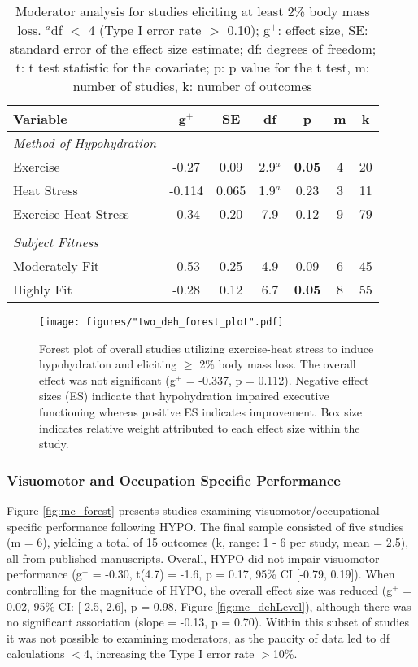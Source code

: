\begin{table}
	\caption{Moderator analysis for studies eliciting at least 2\% body mass loss. ${^a}$df ${<}$ 4 (Type I error rate ${>}$ 0.10); g${^+}$: effect size, SE: standard error of the effect size estimate; df: degrees of freedom; t: t test statistic for the covariate; p: p value for the t test, m: number of studies, k: number of outcomes}
	\centering
	\begin{tabular}{lcccccc} 
		\hline
		\textbf{Variable} & \textbf{g${^+}$} & \textbf{SE} & \textbf{df} & \textbf{p} & \textbf{m} & 
		\textbf{k} \\
		\hline
		\textit{Method of Hypohydration} &&&&&& \\
		Exercise & -0.27 & 0.09 & 2.9${^a}$ & \textbf{0.05} & 4 & 20 \\
		Heat Stress & -0.114 & 0.065 & 1.9${^a}$ & 0.23 & 3 & 11 \\
		Exercise-Heat Stress & -0.34 & 0.20 & 7.9 & 0.12 & 9 & 79 \\
		&&&&&& \\
		\textit{Subject Fitness} &&&&&& \\
		Moderately Fit & -0.53 & 0.25 & 4.9 & 0.09 & 6 & 45 \\
		Highly Fit & -0.28 & 0.12 & 6.7 & \textbf{0.05} & 8 & 55 \\ 
		\hline		    
	\end{tabular}
	\label{tbl:ehs_2_moderators}
\end{table}


\begin{figure}
	\centering
	\texttt{[image: figures/"two\_deh\_forest\_plot".pdf]}
	\caption{Forest plot of overall studies utilizing exercise-heat stress to induce hypohydration and eliciting ${\ge}$ 2\% body mass loss. The overall effect was not significant (g${^+}$ = -0.337, p = 0.112). Negative effect sizes (ES) indicate that hypohydration impaired executive functioning whereas positive ES indicates improvement. Box size indicates relative weight attributed to each effect size within the study.}
	\label{fig:two_deh_forest_plot}
\end{figure}


\subsubsection{Visuomotor and Occupation Specific Performance}
Figure \ref{fig:mc_forest} presents studies examining visuomotor/occupational specific performance following HYPO. The final sample consisted of five studies (m = 6), yielding a total of 15 outcomes (k, range: 1 - 6 per study, mean = 2.5), all from published manuscripts. Overall, HYPO did not impair visuomotor performance (g${^+}$ = -0.30, t(4.7) = -1.6, p = 0.17, 95\% CI [-0.79, 0.19]). When controlling for the magnitude of HYPO, the overall effect size was reduced (g${^+}$ = 0.02, 95\% CI: [-2.5, 2.6], p = 0.98, Figure \ref{fig:mc_dehLevel}), although there was no significant association (slope = -0.13, p = 0.70). Within this subset of studies it was not possible to examining moderators, as the paucity of data led to df calculations $<$4, increasing the Type I error rate $>$10\%.     

